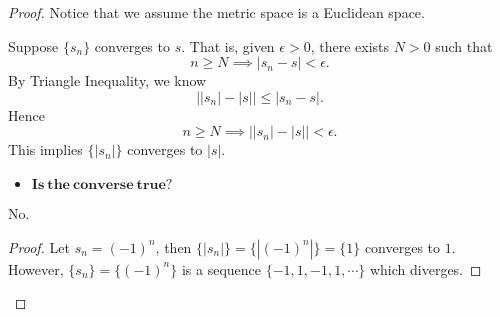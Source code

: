 \begin{Exercise}
\begin{proof}
Notice that we assume the metric space is a Euclidean space.

Suppose $\{s_n\}$ converges to $s$. That is, given $\epsilon>0$, there exists $N>0$ such that
$$
n\geq N \implies |s_n-s| < \epsilon.
$$
By Triangle Inequality, we know
$$
\left| |s_n|-|s| \right| \leq |s_n-s|.
$$
Hence
$$
n\geq N \implies \left| |s_n|-|s| \right| < \epsilon.
$$
This implies $\{|s_n|\}$ converges to $|s|$.
\begin{itemize}
\item $\mathbf{Is\ the\ converse\ true?}$
\end{itemize}
\begin{answer}
No.
\end{answer}
\begin{proof}
Let $s_n = (-1)^n$, then $\{|s_n|\} = \{ |(-1)^n| \} = \{ 1 \}$ converges to $1$. However, $\{ s_n \} = \{ (-1)^n \}$ is a sequence $\{-1,1,-1,1,\cdots \}$ which diverges.
\end{proof}
\end{proof}
\end{Exercise}